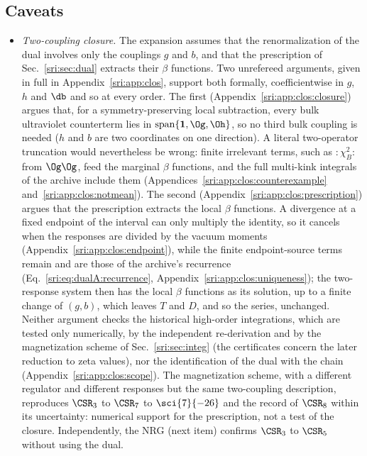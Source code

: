 \subsection{Caveats}\label{sri:sec:d1caveats}
\begin{itemize}
\item \emph{Two-coupling closure.} The expansion assumes that the renormalization of the dual involves only the
 couplings $g$ and $b$, and that the prescription of Sec.~\ref{sri:sec:dual} extracts their $\beta$ functions. Two
 unrefereed arguments, given in full in Appendix~\ref{sri:app:clos}, support both formally, coefficientwise in $g$, $h$
 and $\db$ and so at every order. The first (Appendix~\ref{sri:app:clos:closure}) argues that, for a symmetry-preserving
 local subtraction, every bulk ultraviolet counterterm lies in $\mathrm{span}\{\mathbf 1,\Og,\Oh\}$, so no third bulk coupling is needed ($h$ and $b$ are two coordinates on one
 direction). A literal two-operator truncation would nevertheless be wrong: finite irrelevant terms, such as
 ${:}\chi_B^2{:}$ from $\Og\Og$, feed the marginal $\beta$ functions, and the full multi-kink integrals of the archive
 include them (Appendices~\ref{sri:app:clos:counterexample} and~\ref{sri:app:clos:notmean}). The second
 (Appendix~\ref{sri:app:clos:prescription}) argues that the prescription extracts the local $\beta$ functions. A
 divergence at a fixed endpoint of the interval can only multiply the identity, so it cancels when the responses are
 divided by the vacuum moments (Appendix~\ref{sri:app:clos:endpoint}), while the finite endpoint-source terms remain
 and are those of the archive's recurrence (Eq.~\eqref{sri:eq:dualA:recurrence}, Appendix~\ref{sri:app:clos:uniqueness}); the two-response system then has the local $\beta$ functions as its solution, up to a finite change of
 $(g,b)$, which leaves $T$ and $D$, and so the series, unchanged. Neither argument checks the historical high-order
 integrations, which are tested only numerically, by the independent re-derivation and by the magnetization scheme of
 Sec.~\ref{sri:sec:integ} (the certificates concern the later reduction to zeta values), nor the identification of the dual
 with the chain (Appendix~\ref{sri:app:clos:scope}). The magnetization scheme, with a different regulator and different
 responses but the same two-coupling description, reproduces $\CSR_3$ to $\CSR_7$ to $\sci{7}{-26}$ and the record of
 $\CSR_8$ within its uncertainty: numerical support for the prescription, not a test of the closure. Independently, the NRG (next item) confirms $\CSR_3$ to $\CSR_5$ without using the dual.

\end{itemize}
